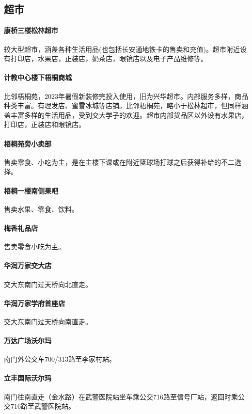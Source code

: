 \documentclass[
decoration,  %
]{qyxf-book}
\begin{document}
	\subsection{超市}
	\paragraph{康桥三楼松林超市}
	较大型超市，涵盖各种生活用品(也包括长安通地铁卡的售卖和充值)。超市附近设有打印店，水果店，正装店，奶茶店，眼镜店以及电子产品维修等。
	\paragraph{计教中心楼下梧桐商城}
	比邻梧桐苑，2023年暑假新装修完投入使用，旧为兴华超市。内部服务多样，商品种类丰富。有理发店、蜜雪冰城等店铺。比邻梧桐苑，略小于松林超市，但同样涵盖丰富多样的生活用品，受到交大学子的欢迎。超市内部货品区以外设有水果店，打印店，正装店和眼镜店。
	\paragraph{梧桐苑旁小卖部}
	售卖零食、小吃为主，是在主楼下课或在附近篮球场打球之后获得补给的不二选择。
	\paragraph{梧桐一楼南侧果吧}
	售卖水果、零食、饮料。
	\paragraph{梅香礼品店}售卖零食小吃为主。
	\paragraph{华润万家交大店}
	交大东南门过天桥向北直走。
	\paragraph{华润万家学府首座店}
	交大东南门过天桥向南直走。
	\paragraph{万达广场沃尔玛}
	南门外公交车700/313路至李家村站。
	\paragraph{立丰国际沃尔玛}
	南门往南直走（金水路）在武警医院站坐车乘公交716路至信号厂站，返回时乘公交716路至武警医院站。
	
\end{document}
